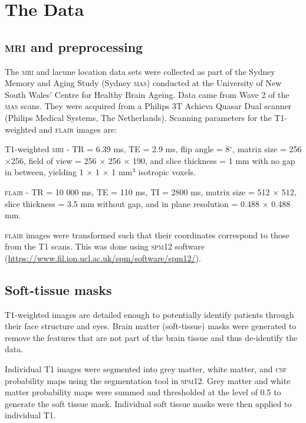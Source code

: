 


\chapter{The Data}\label{model}

\section{\textsc{mri} and preprocessing}\label{data-mri}

The \textsc{mri} and lacune location data sets were collected as part of the Sydney Memory and Aging Study (Sydney \textsc{mas}) conducted at the University of New South Wales' Centre for Healthy Brain Ageing. Data came from Wave 2 of the \textsc{mas} scans. They were acquired from a Philips 3T Achieva Quasar Dual scanner (Philips Medical Systems, The Netherlands). Scanning parameters for the T1-weighted and \textsc{flair} images are:

T1-weighted \textsc{mri} - TR = 6.39 ms, TE = 2.9 ms, flip angle = 8$^\circ$, matrix size = 256$\times$256, field of view = 256 $\times$ 256 $\times$ 190, and slice thickness = 1 mm with no gap in between, yielding 1 $\times$ 1 $\times$ 1 mm$^3$ isotropic voxels.

\textsc{flair} - TR = 10 000 ms, TE = 110 ms, TI = 2800 ms, matrix size = 512 $\times$ 512, slice thickness = 3.5 mm without gap, and in plane resolution = 0.488 $\times$ 0.488 mm.

\textsc{flair} images were transformed such that their coordinates correspond to those from the T1 scans. This was done using \textsc{spm12} software (\url{https://www.fil.ion.ucl.ac.uk/spm/software/spm12/}).

\section{Soft-tissue masks}\label{data-soft}

T1-weighted images are detailed enough to potentially identify patients through their face structure and eyes. Brain matter (soft-tissue) masks were generated to remove the features that are not part of the brain tissue and thus de-identify the data.

Individual T1 images were segmented into grey matter, white matter, and \textsc{csf} probability maps using the segmentation tool in \textsc{spm12}. Grey matter and white matter probability maps were summed and thresholded at the level of 0.5 to generate the soft tissue mask. Individual soft tissue masks were then applied to individual T1.

